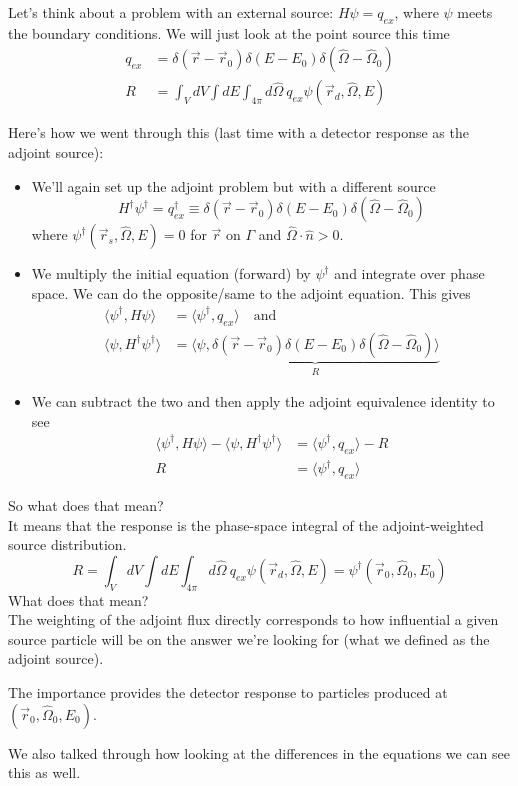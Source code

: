 \documentclass[12pt]{article}
\newcommand{\rvec}{\ensuremath{\vec{r}}}
\newcommand{\vOmega}{\ensuremath{\hat{\Omega}}}
\begin{document}
Let's think about a problem with an external source: $H \psi = q_{ex}$, where $\psi$ meets the boundary conditions. We will just look at the point source this time
%
\begin{align*}
q_{ex} &= \delta(\rvec - \rvec_0) \delta(E - E_0) \delta(\vOmega - \vOmega_0) \\
R &= \int_V dV \int dE \int_{4\pi} d\vOmega\: q_{ex} \psi(\rvec_d, \vOmega, E)%
\end{align*}

Here's how we went through this (last time with a detector response as the adjoint source):
\begin{itemize}
\item We'll again set up the adjoint problem but with a different source
\[H^{\dagger}\psi^{\dagger} = q_{ex}^{\dagger} \equiv  \delta(\rvec - \rvec_0) \delta(E - E_0) \delta(\vOmega - \vOmega_0)\]
where $\psi^{\dagger}(\vec{r}_s, \vOmega, E) = 0$ for $\rvec$ on $\Gamma$ and $\vOmega \cdot \hat{n} > 0$.
%
\item We multiply the initial equation (forward) by $\psi^{\dagger}$ and integrate over phase space. We can do the opposite/same to the adjoint equation. This gives
\begin{align*}
\langle\psi^{\dagger}, H\psi\rangle &= \langle\psi^{\dagger}, q_{ex}\rangle \quad \text{and}\\
\langle\psi, H^{\dagger} \psi^{\dagger}\rangle &= \underbrace{\langle\psi, \delta(\rvec - \rvec_0) \delta(E - E_0) \delta(\vOmega - \vOmega_0)\rangle }_R
\end{align*}
%
\item We can subtract the two and then apply the adjoint equivalence identity to see
\begin{align*}
\langle\psi^{\dagger}, H\psi\rangle - \langle\psi, H^{\dagger} \psi^{\dagger}\rangle &= \langle\psi^{\dagger}, q_{ex}\rangle - R \\
R &= \langle\psi^{\dagger}, q_{ex}\rangle
\end{align*}
\end{itemize}
%
So what does that mean? \\
It means that the response is the phase-space integral of the adjoint-weighted source distribution. 
\[
R = \int_V dV \int dE \int_{4\pi} d\vOmega\: q_{ex} \psi(\rvec_d, \vOmega, E)=\psi^{\dagger}(\rvec_0, \vOmega_0, E_0)
\]
What does that mean? \\
The weighting of the adjoint flux directly corresponds to how influential a given source particle will be on the answer we're looking for (what we defined as the adjoint source).

The importance provides the detector response to particles produced at $(\rvec_0, \vOmega_0, E_0)$.

We also talked through how looking at the differences in the equations we can see this as well. 
\end{document}

